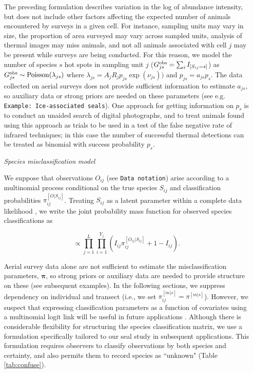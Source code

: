 \documentclass[12pt,fleqn]{article}
\begin{document}
\begin{flushleft}
The preceding formulation describes variation in the log of abundance intensity, but does not
include other factors affecting the expected number of animals encountered by surveys in a given cell.  For instance, sampling units may vary in size, the proportion of area surveyed may vary across sampled units, analysis of thermal images may miss animals, and not all animals associated with cell $j$ may be present while surveys are being conducted.  For this reason, we model the number of species $s$ hot spots in sampling unit $j$ ($G_{js}^{\rm obs}=\sum_i I_{[S_{ij}=s]}$) as $G_{js}^{\rm obs} \sim {\rm Poisson}(\lambda_{js})$ where $\lambda_{js}=A_j R_j p_{js} \exp(\nu_{js}))$ and $p_{js}=a_{js}p_s$.  The data collected on aerial surveys does not provide sufficient information to estimate $a_{js}$, so auxiliary data or strong priors are needed on these parameters (see e.g. \texttt{Example: Ice-associated seals}).  One approach for getting information on $p_s$ is to conduct an unaided search of digital photographs, and to treat animals found using this approach as trials to be used in a test of the false negative rate of infrared techniques; in this case the number of successful thermal detections can be treated as binomial with success probability $p_s$.

\vspace{.15in}
{\it Species misclassification model} \\
\vspace{.15in}

We suppose that observations $O_{ij}$ (see \texttt{Data notation}) arise according to a multinomial process conditional on the
true species $S_{ij}$ and classification probabilities $\pi_{ij}^{[O|S_{ij}]}$.  Treating $S_{ij}$ as a latent parameter within a complete data likelihood \citep[see, e.g.][]{Dempster1977}, we write the joint probability mass function for observed species classifications as
\begin{linenomath*}
\begin{equation*}
  [{\bf O} | {\bf S}, \boldsymbol{\pi}] \propto \prod_{j=1}^L \prod_{i=1}^{Y_j} \left( I_{ij} \pi_{ij}^{[O_{ij} | S_{ij}]} + 1-I_{ij} \right).
\end{equation*}
\end{linenomath*}
Aerial survey data alone are not sufficient to estimate the misclassification parameters, $\boldsymbol{\pi}$, so strong priors or auxiliary data are needed to provide structure on these (see subsequent examples).  In the following sections, we suppress dependency on individual and transect (i.e., we set $\pi_{ij}^{[m|s]}=\pi^{[m|s]}$).  However, we suspect that expressing classification parameters as a function of covariates using a multinomial logit link \citep{Agresti2002} will be useful in future applications \citep[see e.g.][for further discussion]{ConnEtAl2013}.  Although there is considerable flexibility for structuring the species classification matrix, we use a formulation specifically tailored to our seal study in subsequent applications.  This formulation requires observers to classify observations by both species and certainty, and also permits them to record species as ``unknown" (Table \ref{tab:confuse}).


\end{flushleft}
\end{document}
